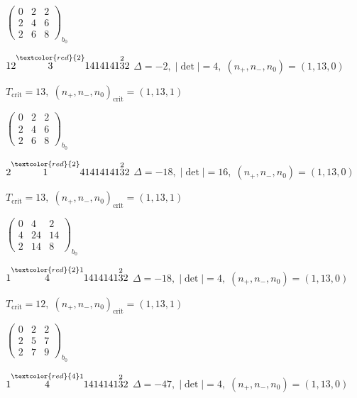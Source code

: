 \documentclass[10pt]{article}
\begin{document}
\hspace{2em}$\left(\begin{smallmatrix}0 & 2 & 2 \\ 2 & 4 & 6 \\ 2 & 6 & 8\end{smallmatrix}\right)_{\!b_0}$

$12\overset{\textcolor{red}{2}}{3}1414141\overset{2}{3}2$ \quad $\Delta=-2,\; |\det|=4,\; (n_+,n_-,n_0)=(1,13,0)$

\hspace{1em}$T_{\text{crit}}=13,\; (n_+,n_-,n_0)_{\text{crit}}=(1,13,1)$

\hspace{2em}$\left(\begin{smallmatrix}0 & 2 & 2 \\ 2 & 4 & 6 \\ 2 & 6 & 8\end{smallmatrix}\right)_{\!b_0}$

\smallskip

$2\overset{\textcolor{red}{2}}{1}41414141\overset{2}{3}2$ \quad $\Delta=-18,\; |\det|=16,\; (n_+,n_-,n_0)=(1,13,0)$

\hspace{1em}$T_{\text{crit}}=13,\; (n_+,n_-,n_0)_{\text{crit}}=(1,13,1)$

\hspace{2em}$\left(\begin{smallmatrix}0 & 4 & 2 \\ 4 & 24 & 14 \\ 2 & 14 & 8\end{smallmatrix}\right)_{\!b_0}$

\smallskip

$1\overset{\textcolor{red}{2}1}{4}1414141\overset{2}{3}2$ \quad $\Delta=-18,\; |\det|=4,\; (n_+,n_-,n_0)=(1,13,0)$

\hspace{1em}$T_{\text{crit}}=12,\; (n_+,n_-,n_0)_{\text{crit}}=(1,13,1)$

\hspace{2em}$\left(\begin{smallmatrix}0 & 2 & 2 \\ 2 & 5 & 7 \\ 2 & 7 & 9\end{smallmatrix}\right)_{\!b_0}$

$1\overset{\textcolor{red}{4}1}{4}1414141\overset{2}{3}2$ \quad $\Delta=-47,\; |\det|=4,\; (n_+,n_-,n_0)=(1,13,0)$
\end{document}
